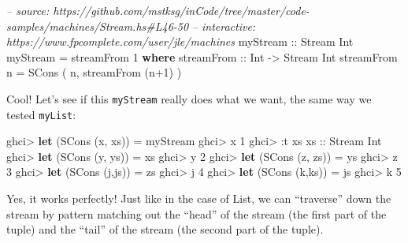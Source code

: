\documentclass[]{article}
\newenvironment{Shaded}{}{}
\newcommand{\KeywordTok}[1]{\textcolor[rgb]{0.00,0.44,0.13}{\textbf{{#1}}}}
\newcommand{\DataTypeTok}[1]{\textcolor[rgb]{0.56,0.13,0.00}{{#1}}}
\newcommand{\DecValTok}[1]{\textcolor[rgb]{0.25,0.63,0.44}{{#1}}}
\newcommand{\CommentTok}[1]{\textcolor[rgb]{0.38,0.63,0.69}{\textit{{#1}}}}
\newcommand{\OtherTok}[1]{\textcolor[rgb]{0.00,0.44,0.13}{{#1}}}
\newcommand{\FunctionTok}[1]{\textcolor[rgb]{0.02,0.16,0.49}{{#1}}}
\newcommand{\NormalTok}[1]{{#1}}
\begin{document}
\begin{Shaded}
\begin{Highlighting}[]
\CommentTok{-- source: https://github.com/mstksg/inCode/tree/master/code-samples/machines/Stream.hs#L46-50}
\CommentTok{-- interactive: https://www.fpcomplete.com/user/jle/machines}
\OtherTok{myStream ::} \DataTypeTok{Stream} \DataTypeTok{Int}
\NormalTok{myStream }\FunctionTok{=} \NormalTok{streamFrom }\DecValTok{1}
  \KeywordTok{where}
\OtherTok{    streamFrom ::} \DataTypeTok{Int} \OtherTok{->} \DataTypeTok{Stream} \DataTypeTok{Int}
    \NormalTok{streamFrom n }\FunctionTok{=} \DataTypeTok{SCons} \NormalTok{( n, streamFrom (n}\FunctionTok{+}\DecValTok{1}\NormalTok{) )}
\end{Highlighting}
\end{Shaded}

Cool! Let's see if this \texttt{myStream} really does what we want, the
same way we tested \texttt{myList}:

\begin{Shaded}
\begin{Highlighting}[]
\NormalTok{ghci}\FunctionTok{>} \KeywordTok{let} \NormalTok{(}\DataTypeTok{SCons} \NormalTok{(x, xs)) }\FunctionTok{=} \NormalTok{myStream}
\NormalTok{ghci}\FunctionTok{>} \NormalTok{x}
\DecValTok{1}
\NormalTok{ghci}\FunctionTok{>} \FunctionTok{:}\NormalTok{t xs}
\OtherTok{xs ::} \DataTypeTok{Stream} \DataTypeTok{Int}
\NormalTok{ghci}\FunctionTok{>} \KeywordTok{let} \NormalTok{(}\DataTypeTok{SCons} \NormalTok{(y, ys)) }\FunctionTok{=} \NormalTok{xs}
\NormalTok{ghci}\FunctionTok{>} \NormalTok{y}
\DecValTok{2}
\NormalTok{ghci}\FunctionTok{>} \KeywordTok{let} \NormalTok{(}\DataTypeTok{SCons} \NormalTok{(z, zs)) }\FunctionTok{=} \NormalTok{ys}
\NormalTok{ghci}\FunctionTok{>} \NormalTok{z}
\DecValTok{3}
\NormalTok{ghci}\FunctionTok{>} \KeywordTok{let} \NormalTok{(}\DataTypeTok{SCons} \NormalTok{(j,js)) }\FunctionTok{=} \NormalTok{zs}
\NormalTok{ghci}\FunctionTok{>} \NormalTok{j}
\DecValTok{4}
\NormalTok{ghci}\FunctionTok{>} \KeywordTok{let} \NormalTok{(}\DataTypeTok{SCons} \NormalTok{(k,ks)) }\FunctionTok{=} \NormalTok{js}
\NormalTok{ghci}\FunctionTok{>} \NormalTok{k}
\DecValTok{5}
\end{Highlighting}
\end{Shaded}

Yes, it works perfectly! Just like in the case of List, we can
``traverse'' down the stream by pattern matching out the ``head'' of the
stream (the first part of the tuple) and the ``tail'' of the stream (the
second part of the tuple).
\end{document}
